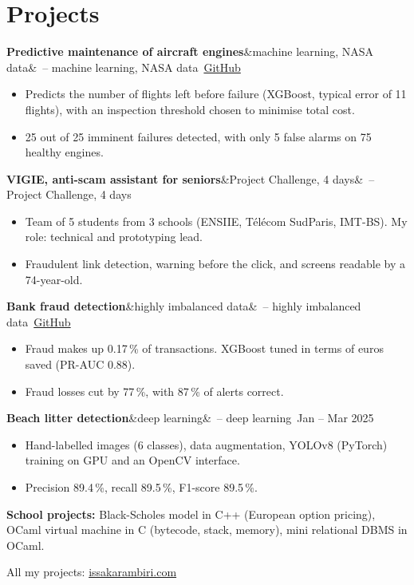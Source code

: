 \documentclass[10pt]{article}
\newcommand{\entree}[3]{\par\noindent\textbf{#1}\ifx&#2&\else\ {\color{gris}-- #2}\fi\ \hfill{\color{gris}#3}\par\vspace{1pt}}
\begin{document}
\section*{Projects}
\entree{Predictive maintenance of aircraft engines}{machine learning, NASA data}{\href{https://github.com/KARAMBIRI65/maintenance-predictive-moteurs-avion}{GitHub}}
\begin{itemize}
  \item Predicts the number of flights left before failure (XGBoost, typical error of 11 flights), with an inspection threshold chosen to minimise total cost.
  \item 25 out of 25 imminent failures detected, with only 5 false alarms on 75 healthy engines.
\end{itemize}
\vspace{3pt}
\entree{VIGIE, anti-scam assistant for seniors}{Project Challenge, 4 days}{}
\begin{itemize}
  \item Team of 5 students from 3 schools (ENSIIE, Télécom SudParis, IMT-BS). My role: technical and prototyping lead.
  \item Fraudulent link detection, warning before the click, and screens readable by a 74-year-old.
\end{itemize}
\vspace{3pt}
\entree{Bank fraud detection}{highly imbalanced data}{\href{https://github.com/KARAMBIRI65/detection-fraude-bancaire}{GitHub}}
\begin{itemize}
  \item Fraud makes up 0.17\,\% of transactions. XGBoost tuned in terms of euros saved (PR-AUC 0.88).
  \item Fraud losses cut by 77\,\%, with 87\,\% of alerts correct.
\end{itemize}
\vspace{3pt}
\entree{Beach litter detection}{deep learning}{Jan -- Mar 2025}
\begin{itemize}
  \item Hand-labelled images (6 classes), data augmentation, YOLOv8 (PyTorch) training on GPU and an OpenCV interface.
  \item Precision 89.4\,\%, recall 89.5\,\%, F1-score 89.5\,\%.
\end{itemize}
\vspace{3pt}
\textbf{School projects:} Black-Scholes model in C++ (European option pricing), OCaml virtual machine in C (bytecode, stack, memory), mini relational DBMS in OCaml.\par
{\color{gris}All my projects: \href{https://issakarambiri.com}{issakarambiri.com}}
\end{document}
